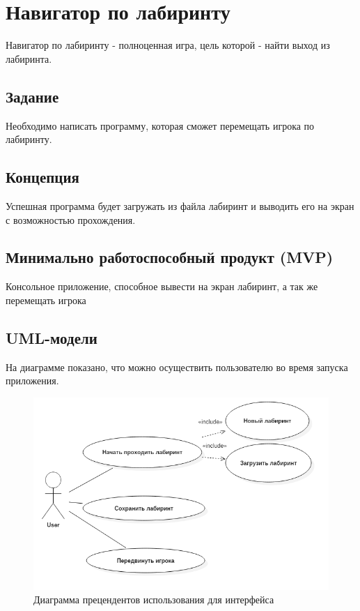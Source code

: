 \documentclass[a4paper]{article}
\begin{document}
\vfill %

\tableofcontents
\newpage

\section{Навигатор по лабиринту}
	Навигатор по лабиринту - полноценная игра, цель которой - найти выход из лабиринта. 

\subsection*{Задание}
	Необходимо написать программу, которая сможет перемещать игрока по лабиринту.
\subsection*{Концепция}
	Успешная программа будет загружать из файла лабиринт и выводить его на экран с возможностью прохождения.
	
\subsection*{Минимально работоспособный продукт (MVP)}

Консольное приложение, способное вывести на экран лабиринт, а так же перемещать игрока
\subsection*{UML-модели}
На диаграмме показано, что можно осуществить пользователю во время запуска приложения.

\begin{figure}[H]
	\begin{center}
		\includegraphics[scale=0.4]{UseCaseDiagram.png}
		\caption{Диаграмма прецендентов использования для интерфейса} 
		\label{pic:pic_name} %
	\end{center}
\end{figure}
\end{document}
